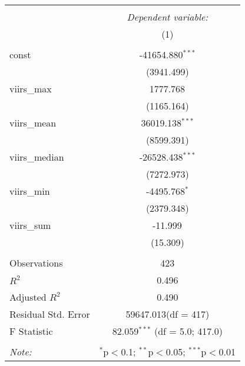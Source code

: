 \begin{table}[!htbp] \centering
\begin{tabular}{@{\extracolsep{5pt}}lc}
\\[-1.8ex]\hline
\hline \\[-1.8ex]
& \multicolumn{1}{c}{\textit{Dependent variable:}} \
\cr \cline{1-2}
\\[-1.8ex] & (1) \\
\hline \\[-1.8ex]
 const & -41654.880$^{***}$ \\
  & (3941.499) \\
 viirs_max & 1777.768$^{}$ \\
  & (1165.164) \\
 viirs_mean & 36019.138$^{***}$ \\
  & (8599.391) \\
 viirs_median & -26528.438$^{***}$ \\
  & (7272.973) \\
 viirs_min & -4495.768$^{*}$ \\
  & (2379.348) \\
 viirs_sum & -11.999$^{}$ \\
  & (15.309) \\
\hline \\[-1.8ex]
 Observations & 423 \\
 $R^2$ & 0.496 \\
 Adjusted $R^2$ & 0.490 \\
 Residual Std. Error & 59647.013(df = 417)  \\
 F Statistic & 82.059$^{***}$ (df = 5.0; 417.0) \\
\hline
\hline \\[-1.8ex]
\textit{Note:} & \multicolumn{1}{r}{$^{*}$p$<$0.1; $^{**}$p$<$0.05; $^{***}$p$<$0.01} \\
\end{tabular}
\end{table}